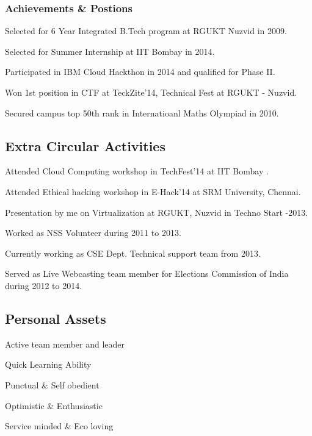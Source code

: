 \documentclass[8pt]{article}
\begin{document}
 

\subsubsection*{Achievements \& Postions}
\onehalfspacing
\begin{compactitem}
	\item Selected for 6 Year Integrated B.Tech program at RGUKT Nuzvid in 2009.
	\item Selected for Summer Internship at IIT Bombay in 2014.
	\item Participated in IBM Cloud Hackthon in 2014 and qualified for Phase II.
	\item Won 1st position in CTF at TeckZite'14, Technical Fest at RGUKT - Nuzvid.
	\item Secured campus top 50th rank in Internatioanl Maths Olympiad in 2010.  
\end{compactitem}

\subsection*{Extra Circular Activities}
\onehalfspacing
\begin{compactitem}
	\item Attended Cloud Computing workshop in TechFest'14 at IIT Bombay . 
	\item Attended Ethical hacking workshop in E-Hack'14 at SRM University, Chennai.
	\item Presentation by me on Virtualization at RGUKT, Nuzvid in Techno Start -2013.
	\item Worked as NSS Volunteer during 2011 to 2013.
	\item Currently working as CSE Dept. Technical support team from 2013. 
	\item Served as Live Webcasting team member for Elections Commission of India during 2012 to 2014.
\end{compactitem}

\subsection*{Personal Assets}
\onehalfspacing
\begin{compactitem}
	\item Active team member and leader
	\item Quick Learning Ability
	\item Punctual \& Self obedient
	\item Optimistic \& Enthusiastic
	\item Service minded \& Eco loving
\end{compactitem}
\end{document}
